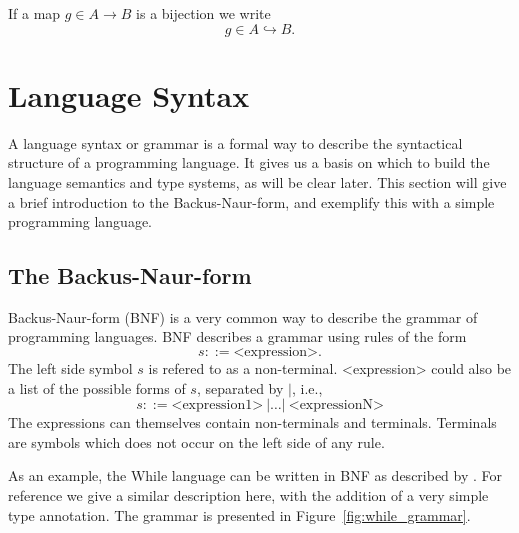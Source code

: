\begin{notation}
  If a map $g\in A \to B$ is a bijection we write
  \begin{equation*}
    g \in A \hookrightarrow B.
  \end{equation*}
\end{notation}


\section{Language Syntax} \label{sec:language_syntax}

A language syntax or grammar is a formal way to describe the syntactical
structure of a programming language. It gives us a basis on which to build the
language semantics and type systems, as will be clear later. This section will
give a brief introduction to the Backus-Naur-form, and exemplify this with
a simple programming language.

\subsection{The Backus-Naur-form} \label{sub:the_backus_naur_form} 

Backus-Naur-form (BNF) is a very common way to describe the grammar of
programming languages. BNF describes a grammar using rules of the form
\begin{equation*}
  s ::= \text{<expression>}.
\end{equation*}
The left side symbol $s$ is refered to as a non-terminal. <expression> could
also be a list of the
possible forms of $s$, separated by $|$, i.e., 
\begin{equation*}
  s ::= \text{<expression1>} \: | \dots | \: \text{<expressionN>}
\end{equation*}
The expressions can themselves contain non-terminals and terminals.
Terminals are symbols which does not occur on the left side of any rule.

As an example, the While language can be written in BNF as described
by \textcite{nielson2007semantics}. For reference we give a similar description
here, with the addition of a very simple type annotation. The grammar is presented in
Figure~\ref{fig:while_grammar}.

